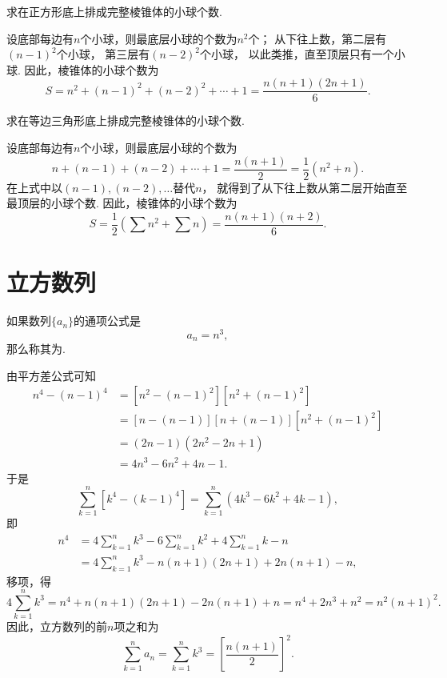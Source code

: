 \begin{example}
求在正方形底上排成完整棱锥体的小球个数.
\begin{solution}
设底部每边有\(n\)个小球，则最底层小球的个数为\(n^2\)个；
从下往上数，第二层有\((n-1)^2\)个小球，
第三层有\((n-2)^2\)个小球，
以此类推，直至顶层只有一个小球.
因此，棱锥体的小球个数为\[
    S = n^2+(n-1)^2+(n-2)^2+\dotsb+1
    = \frac{n(n+1)(2n+1)}{6}.
\]
\end{solution}
\end{example}

\begin{example}
求在等边三角形底上排成完整棱锥体的小球个数.
\begin{solution}
设底部每边有\(n\)个小球，则最底层小球的个数为\[
    n+(n-1)+(n-2)+\dotsb+1
    = \frac{n(n+1)}{2}
    = \frac{1}{2}(n^2+n).
\]
在上式中以\((n-1),(n-2),\dotsc\)替代\(n\)，
就得到了从下往上数从第二层开始直至最顶层的小球个数.
因此，棱锥体的小球个数为\[
    S = \frac{1}{2} (\sum n^2 + \sum n)
    = \frac{n(n+1)(n+2)}{6}.
\]
\end{solution}
\end{example}

\section{立方数列}
如果数列\(\{a_n\}\)的通项公式是\[
a_n = n^3,
\]那么称其为.

由平方差公式可知
\[\begin{aligned}
n^4 - (n-1)^4
&= [n^2 - (n-1)^2] [n^2 + (n-1)^2] \\
&= [n - (n-1)] [n + (n-1)] [n^2 + (n-1)^2] \\
&= (2n-1) (2n^2 - 2n + 1) \\
&= 4n^3 - 6n^2 + 4n - 1.
\end{aligned}\]
于是\[
\sum\limits_{k=1}^n [k^4 - (k-1)^4]
= \sum\limits_{k=1}^n (4k^3 - 6k^2 + 4k - 1),
\]即\[\begin{aligned}
n^4
&= 4 \sum\limits_{k=1}^n k^3 - 6 \sum\limits_{k=1}^n k^2 + 4 \sum\limits_{k=1}^n k - n \\
&= 4 \sum\limits_{k=1}^n k^3 - n(n+1)(2n+1) + 2n(n+1) - n,
\end{aligned}\]
移项，得\[
4 \sum\limits_{k=1}^n k^3
= n^4 + n(n+1)(2n+1) - 2n(n+1) + n
= n^4 + 2n^3 + n^2
= n^2(n+1)^2.
\]
因此，立方数列的前\(n\)项之和为
\begin{equation}
\sum\limits_{k=1}^n a_n
= \sum\limits_{k=1}^n k^3
= \left[\frac{n(n+1)}{2}\right]^2.
\end{equation}

